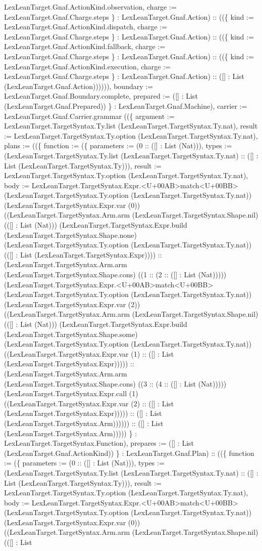 \documentclass[11pt]{article}
\begin{document}
LexLeanTarget.Gnaf.ActionKind.observation, charge := LexLeanTarget.Gnaf.Charge.steps \} : LexLeanTarget.Gnaf.Action) :: ((\{ kind := LexLeanTarget.Gnaf.ActionKind.dispatch, charge := LexLeanTarget.Gnaf.Charge.steps \} : LexLeanTarget.Gnaf.Action) :: ((\{ kind := LexLeanTarget.Gnaf.ActionKind.fallback, charge := LexLeanTarget.Gnaf.Charge.steps \} : LexLeanTarget.Gnaf.Action) :: ((\{ kind := LexLeanTarget.Gnaf.ActionKind.execution, charge := LexLeanTarget.Gnaf.Charge.steps \} : LexLeanTarget.Gnaf.Action) :: ([] : List (LexLeanTarget.Gnaf.Action)))))), boundary := LexLeanTarget.Gnaf.Boundary.complete, prepared := ([] : List (LexLeanTarget.Gnaf.Prepared)) \} : LexLeanTarget.Gnaf.Machine), carrier := LexLeanTarget.Gnaf.Carrier.grammar ((\{ argument := LexLeanTarget.TargetSyntax.Ty.list (LexLeanTarget.TargetSyntax.Ty.nat), result := LexLeanTarget.TargetSyntax.Ty.option (LexLeanTarget.TargetSyntax.Ty.nat), plans := ((\{ function := (\{ parameters := (0 :: ([] : List (Nat))), types := (LexLeanTarget.TargetSyntax.Ty.list (LexLeanTarget.TargetSyntax.Ty.nat) :: ([] : List (LexLeanTarget.TargetSyntax.Ty))), result := LexLeanTarget.TargetSyntax.Ty.option (LexLeanTarget.TargetSyntax.Ty.nat), body := LexLeanTarget.TargetSyntax.Expr.<U+00AB>match<U+00BB> (LexLeanTarget.TargetSyntax.Ty.option (LexLeanTarget.TargetSyntax.Ty.nat)) (LexLeanTarget.TargetSyntax.Expr.var (0)) ((LexLeanTarget.TargetSyntax.Arm.arm (LexLeanTarget.TargetSyntax.Shape.nil) (([] : List (Nat))) (LexLeanTarget.TargetSyntax.Expr.build (LexLeanTarget.TargetSyntax.Shape.none) (LexLeanTarget.TargetSyntax.Ty.option (LexLeanTarget.TargetSyntax.Ty.nat)) (([] : List (LexLeanTarget.TargetSyntax.Expr)))) :: (LexLeanTarget.TargetSyntax.Arm.arm (LexLeanTarget.TargetSyntax.Shape.cons) ((1 :: (2 :: ([] : List (Nat))))) (LexLeanTarget.TargetSyntax.Expr.<U+00AB>match<U+00BB> (LexLeanTarget.TargetSyntax.Ty.option (LexLeanTarget.TargetSyntax.Ty.nat)) (LexLeanTarget.TargetSyntax.Expr.var (2)) ((LexLeanTarget.TargetSyntax.Arm.arm (LexLeanTarget.TargetSyntax.Shape.nil) (([] : List (Nat))) (LexLeanTarget.TargetSyntax.Expr.build (LexLeanTarget.TargetSyntax.Shape.some) (LexLeanTarget.TargetSyntax.Ty.option (LexLeanTarget.TargetSyntax.Ty.nat)) ((LexLeanTarget.TargetSyntax.Expr.var (1) :: ([] : List (LexLeanTarget.TargetSyntax.Expr))))) :: (LexLeanTarget.TargetSyntax.Arm.arm (LexLeanTarget.TargetSyntax.Shape.cons) ((3 :: (4 :: ([] : List (Nat))))) (LexLeanTarget.TargetSyntax.Expr.call (1) ((LexLeanTarget.TargetSyntax.Expr.var (2) :: ([] : List (LexLeanTarget.TargetSyntax.Expr))))) :: ([] : List (LexLeanTarget.TargetSyntax.Arm)))))) :: ([] : List (LexLeanTarget.TargetSyntax.Arm))))) \} : LexLeanTarget.TargetSyntax.Function), prepares := ([] : List (LexLeanTarget.Gnaf.ActionKind)) \} : LexLeanTarget.Gnaf.Plan) :: ((\{ function := (\{ parameters := (0 :: ([] : List (Nat))), types := (LexLeanTarget.TargetSyntax.Ty.list (LexLeanTarget.TargetSyntax.Ty.nat) :: ([] : List (LexLeanTarget.TargetSyntax.Ty))), result := LexLeanTarget.TargetSyntax.Ty.option (LexLeanTarget.TargetSyntax.Ty.nat), body := LexLeanTarget.TargetSyntax.Expr.<U+00AB>match<U+00BB> (LexLeanTarget.TargetSyntax.Ty.option (LexLeanTarget.TargetSyntax.Ty.nat)) (LexLeanTarget.TargetSyntax.Expr.var (0)) ((LexLeanTarget.TargetSyntax.Arm.arm (LexLeanTarget.TargetSyntax.Shape.nil) (([] : List 
\end{document}
